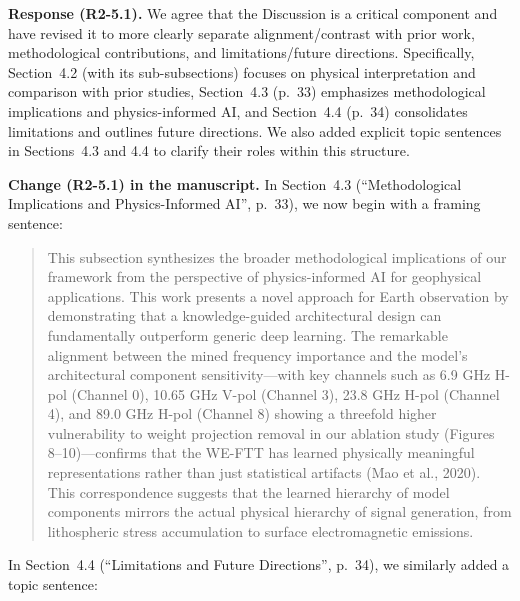\documentclass[12pt]{article}
\newcommand{\revresponse}[1]{\begingroup\color{responsecolor}#1\endgroup}
\newcommand{\revchange}[1]{\begingroup\color{changecolor}#1\endgroup}
\begin{document}
\revresponse{%
\textbf{Response (R2-5.1).} We agree that the Discussion is a critical component and have revised it to more clearly separate alignment/contrast with prior work, methodological contributions, and limitations/future directions. Specifically, Section~4.2 (with its sub-subsections) focuses on physical interpretation and comparison with prior studies, Section~4.3 (p.~33) emphasizes methodological implications and physics-informed AI, and Section~4.4 (p.~34) consolidates limitations and outlines future directions. We also added explicit topic sentences in Sections~4.3 and 4.4 to clarify their roles within this structure.
}

\revchange{%
\textbf{Change (R2-5.1) in the manuscript.}
In Section~4.3 (``Methodological Implications and Physics-Informed AI'', p.~33), we now begin with a framing sentence:

\begin{quote}
This subsection synthesizes the broader methodological implications of our framework from the perspective of physics-informed AI for geophysical applications. This work presents a novel approach for Earth observation by demonstrating that a knowledge-guided architectural design can fundamentally outperform generic deep learning. The remarkable alignment between the mined frequency importance and the model's architectural component sensitivity---with key channels such as 6.9 GHz H-pol (Channel 0), 10.65 GHz V-pol (Channel 3), 23.8 GHz H-pol (Channel 4), and 89.0 GHz H-pol (Channel 8) showing a threefold higher vulnerability to weight projection removal in our ablation study (Figures 8--10)---confirms that the WE-FTT has learned physically meaningful representations rather than just statistical artifacts (Mao et al., 2020). This correspondence suggests that the learned hierarchy of model components mirrors the actual physical hierarchy of signal generation, from lithospheric stress accumulation to surface electromagnetic emissions.
\end{quote}

In Section~4.4 (``Limitations and Future Directions'', p.~34), we similarly added a topic sentence:

}
\end{document}
